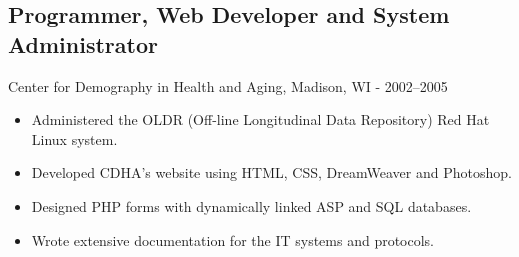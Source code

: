 \documentclass[../main.tex]{subfiles}
\begin{document}
	\subsection*{Programmer, Web Developer and System Administrator}
     Center for Demography in Health and Aging, Madison, WI - 2002--2005
	\begin{itemize}
		\item{Administered the OLDR (Off-line Longitudinal Data Repository) Red Hat Linux system.}
		\item{Developed CDHA's website using HTML, CSS, DreamWeaver and Photoshop.}
		\item{Designed PHP forms with dynamically linked ASP and SQL databases. }
		\item{Wrote extensive documentation for the IT systems and protocols.}

	\end{itemize}
\end{document}
